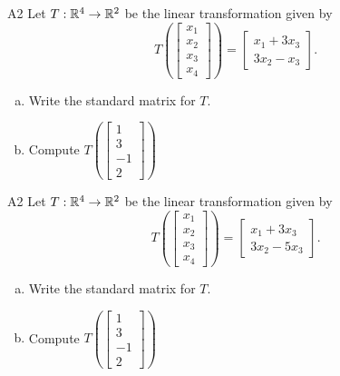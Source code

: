 \begin{problem}{A2}
Let $T: \mathbb{R}^4 \rightarrow \mathbb{R}^2$ be the linear transformation given by $$T\left(\begin{bmatrix} x_1 \\ x_2 \\ x_3 \\ x_4 \end{bmatrix} \right) = \begin{bmatrix} x_1+3x_3 \\ 3x_2-x_3 \end{bmatrix}.$$
\begin{enumerate}[(a)]
\item Write the standard matrix for $T$.
\item Compute \( T\left( \begin{bmatrix} 1 \\ 3 \\ -1 \\ 2 \end{bmatrix} \right) \)
\end{enumerate}
\end{problem}


\begin{problem}{A2}
Let $T: \mathbb{R}^4 \rightarrow \mathbb{R}^2$ be the linear transformation given by $$T\left(\begin{bmatrix} x_1 \\ x_2 \\ x_3 \\ x_4 \end{bmatrix} \right) = \begin{bmatrix} x_1+3x_3 \\ 3x_2-5x_3 \end{bmatrix}.$$
\begin{enumerate}[(a)]
\item Write the standard matrix for $T$.
\item Compute \( T\left( \begin{bmatrix} 1 \\ 3  \\ -1 \\ 2\end{bmatrix} \right) \)
\end{enumerate}
\end{problem}


